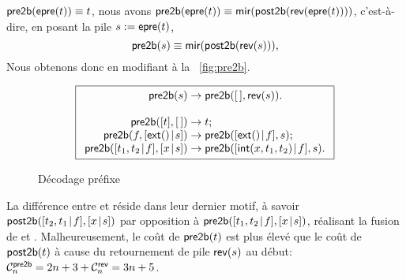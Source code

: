 \(\fun{pre2b}(\fun{epre}(t)) \equiv t\), nous avons
\(\fun{pre2b}(\fun{epre}(t)) \equiv
\fun{mir}(\fun{post2b}(\fun{rev}(\fun{epre}(t))))\), c'est-à-dire, en
posant la pile \(s := \fun{epre}(t)\),
\begin{equation*}
\abovedisplayskip=7pt
\belowdisplayskip=7pt
\fun{pre2b}(s) \equiv \fun{mir}(\fun{post2b}(\fun{rev}(s))),
\end{equation*}
Nous obtenons donc
 en modifiant
 à la
\fig~\vref{fig:pre2b}.
\begin{figure}[b]
\begin{equation*}
\boxed{
\begin{array}{r@{\;}c@{\;}l}
\fun{pre2b}(s) & \rightarrow & \fun{pre2b}(\el,\fun{rev}(s)).\\
\\
\fun{pre2b}([t],\el) & \rightarrow & t;\\
\fun{pre2b}(f,\cons{\fun{ext}()}{s}) & \rightarrow & \fun{pre2b}(\cons{\fun{ext}()}{f},s);\\
\fun{pre2b}(\cons{t_1,t_2}{f},\cons{x}{s}) & \rightarrow &
\fun{pre2b}(\cons{\fun{int}(x,t_1,t_2)}{f},s).
\end{array}}
\end{equation*}
\caption{Décodage préfixe}
\label{fig:pre2b}
\end{figure}
La différence entre  et
 réside dans leur dernier
motif, à savoir \(\fun{post2b}(\cons{t_2,t_1}{f},\cons{x}{s})\) par
opposition à \(\fun{pre2b}(\cons{t_1,t_2}{f},\cons{x}{s})\), réalisant
la fusion de  et . Malheureusement, le coût
de \(\fun{pre2b}(t)\)  est plus élevé que
le coût de \(\fun{post2b}(t)\) à cause du retournement de pile
\(\fun{rev}(s)\) au début: \(\C{\fun{pre2b}}{n} = 2n + 3 +
\C{\fun{rev}}{n} = 3n +
5\).

